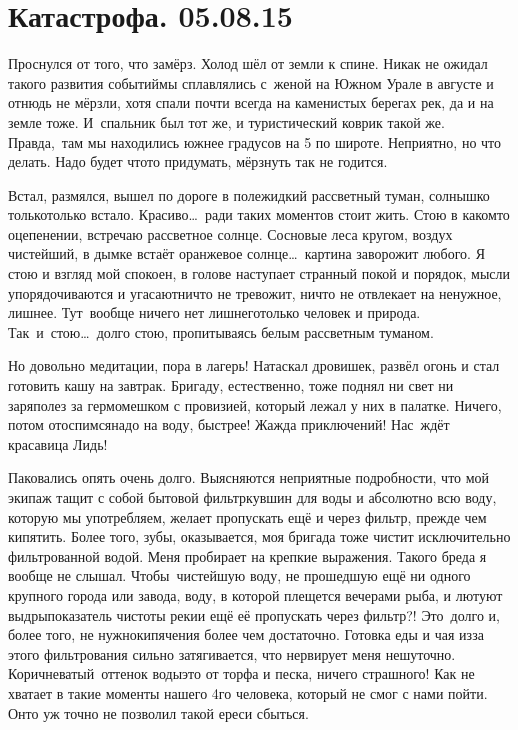 \chapter{Катастрофа. 05.08.15}

Проснулся от того, что замёрз. Холод шёл от земли к спине. Никак не ожидал такого развития событий\mdash мы сплавлялись с~женой на Южном Урале в августе и отнюдь не мёрзли, хотя спали почти всегда на каменистых берегах рек, да и на земле тоже. И~спальник был тот же, и туристический коврик такой же. Правда,~там мы находились южнее градусов на 5 по широте. Неприятно, но что делать. Надо будет что\sdash то придумать, мёрзнуть так не годится. 

Встал, размялся, вышел по дороге в поле\mdash жидкий рассветный туман, солнышко только\sdash только встало. Красиво\ldots~ради таких моментов стоит жить. Стою в каком\sdash то оцепенении, встречаю рассветное солнце. Сосновые леса кругом, воздух чистейший, в дымке встаёт оранжевое солнце\ldots~картина заворожит любого. Я стою и взгляд мой спокоен, в голове наступает странный покой и порядок, мысли упорядочиваются и угасают\mdash ничто не тревожит, ничто не отвлекает на ненужное, лишнее. Тут~вообще ничего нет лишнего\mdash только человек и природа. Так~и~стою\ldots~долго стою, пропитываясь белым рассветным туманом.

Но довольно медитации, пора в лагерь! Натаскал дровишек, развёл огонь и стал готовить кашу на завтрак. Бригаду, естественно, тоже поднял ни свет ни заря\mdash полез за гермомешком с провизией, который лежал у них в палатке. Ничего, потом отоспимся\mdash надо на воду, быстрее! Жажда приключений! Нас~ждёт красавица Лидь! 

Паковались опять очень долго. Выясняются неприятные подробности, что мой экипаж тащит с собой бытовой фильтр\sdash кувшин для воды и абсолютно всю воду, которую мы употребляем, желает пропускать ещё и через фильтр, прежде чем кипятить. Более того, зубы, оказывается, моя бригада тоже чистит исключительно фильтрованной водой. Меня пробирает на крепкие выражения. Такого бреда я вообще не слышал. Чтобы~чистейшую воду, не прошедшую ещё ни одного крупного города или завода, воду, в которой плещется вечерами рыба, и лютуют выдры\mdash показатель чистоты реки\mdash и ещё её пропускать через фильтр?! Это~долго и, более того, не нужно\mdash кипячения более чем достаточно. Готовка еды и чая из\sdash за этого фильтрования сильно затягивается, что нервирует меня нешуточно. Коричневатый~оттенок воды\mdash это от торфа и песка, ничего страшного! Как не хватает в такие моменты нашего 4\sdash го человека, который не смог с нами пойти. Он\sdash то уж точно не позволил такой ереси сбыться. 

